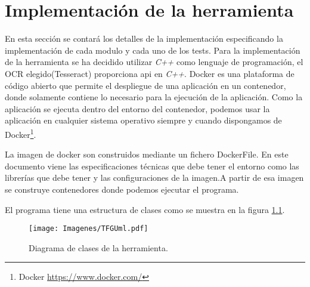 \chapter{Implementación de la herramienta}
\label{cap:implementacion}

En esta sección se contará los detalles de la implementación especificando la implementación de cada modulo y cada uno de los tests.  
Para la implementación de la herramienta se ha decidido utilizar \emph{C++} como lenguaje de programación, el OCR elegido(Tesseract) proporciona api en \emph{C++}. Docker es una plataforma de código abierto que permite el despliegue de una aplicación en un contenedor, donde solamente contiene lo necesario para la ejecución de la aplicación. Como la aplicación se ejecuta dentro del entorno del contenedor, podemos usar la aplicación en cualquier sistema operativo siempre y cuando dispongamos de Docker\footnote{Docker \url{https://www.docker.com/}}.

La imagen de docker son construidos mediante un fichero 
DockerFile. En este documento viene las especificaciones técnicas que debe tener el entorno como las librerías que debe tener y las configuraciones de la imagen.A partir de esa imagen se construye contenedores donde podemos ejecutar el programa.

El programa tiene una estructura de clases como se muestra en la figura \ref{fig:UML}.
\begin{figure}[H]
	\centering
	\texttt{[image: Imagenes/TFGUml.pdf]}
	\caption{Diagrama de clases de la herramienta.}
	\label{fig:UML}
\end{figure}
